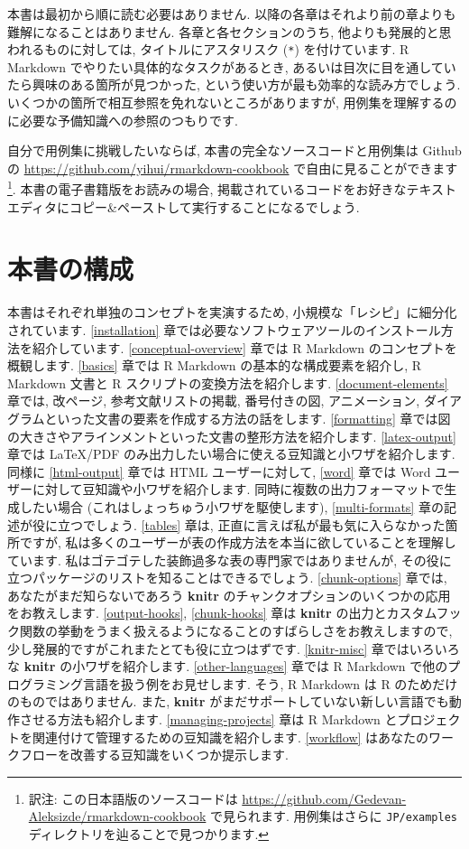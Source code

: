 \documentclass[
  11pt,
  lualatex,ja=standard,jafont=noto]{bxjsreport}
\begin{document}
本書は最初から順に読む必要はありません. 以降の各章はそれより前の章よりも難解になることはありません. 各章と各セクションのうち, 他よりも発展的と思われるものに対しては, タイトルにアスタリスク (\texttt{*}) を付けています. R Markdown でやりたい具体的なタスクがあるとき, あるいは目次に目を通していたら興味のある箇所が見つかった, という使い方が最も効率的な読み方でしょう. いくつかの箇所で相互参照を免れないところがありますが, 用例集を理解するのに必要な予備知識への参照のつもりです.

自分で用例集に挑戦したいならば, 本書の完全なソースコードと用例集は Github の \url{https://github.com/yihui/rmarkdown-cookbook} で自由に見ることができます\footnote{訳注: この日本語版のソースコードは \url{https://github.com/Gedevan-Aleksizde/rmarkdown-cookbook} で見られます. 用例集はさらに \texttt{JP/examples} ディレクトリを辿ることで見つかります.}. 本書の電子書籍版をお読みの場合, 掲載されているコードをお好きなテキストエディタにコピー\&ペーストして実行することになるでしょう.

\hypertarget{Structure-of-the-book}{%
\section*{本書の構成}\label{Structure-of-the-book}}

本書はそれぞれ単独のコンセプトを実演するため, 小規模な「レシピ」に細分化されています. \ref{installation} 章では必要なソフトウェアツールのインストール方法を紹介しています. \ref{conceptual-overview} 章では R Markdown のコンセプトを概観します. \ref{basics} 章では R Markdown の基本的な構成要素を紹介し, R Markdown 文書と R スクリプトの変換方法を紹介します. \ref{document-elements} 章では, 改ページ, 参考文献リストの掲載, 番号付きの図, アニメーション, ダイアグラムといった文書の要素を作成する方法の話をします. \ref{formatting} 章では図の大きさやアラインメントといった文書の整形方法を紹介します. \ref{latex-output} 章では LaTeX/PDF のみ出力したい場合に使える豆知識と小ワザを紹介します. 同様に \ref{html-output} 章では HTML ユーザーに対して, \ref{word} 章では Word ユーザーに対して豆知識や小ワザを紹介します. 同時に複数の出力フォーマットで生成したい場合 (これはしょっちゅう小ワザを駆使します), \ref{multi-formats} 章の記述が役に立つでしょう. \ref{tables} 章は, 正直に言えば私が最も気に入らなかった箇所ですが, 私は多くのユーザーが表の作成方法を本当に欲していることを理解しています. 私はゴテゴテした装飾過多な表の専門家ではありませんが, その役に立つパッケージのリストを知ることはできるでしょう. \ref{chunk-options} 章では, あなたがまだ知らないであろう \textbf{knitr} のチャンクオプションのいくつかの応用をお教えします. \ref{output-hooks}, \ref{chunk-hooks} 章は \textbf{knitr} の出力とカスタムフック関数の挙動をうまく扱えるようになることのすばらしさをお教えしますので, 少し発展的ですがこれまたとても役に立つはずです. \ref{knitr-misc} 章ではいろいろな \textbf{knitr} の小ワザを紹介します. \ref{other-languages} 章では R Markdown で他のプログラミング言語を扱う例をお見せします. そう, R Markdown は R のためだけのものではありません. また, \textbf{knitr} がまだサポートしていない新しい言語でも動作させる方法も紹介します. \ref{managing-projects} 章は R Markdown とプロジェクトを関連付けて管理するための豆知識を紹介します. \ref{workflow} はあなたのワークフローを改善する豆知識をいくつか提示します.
\end{document}
